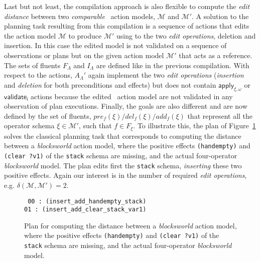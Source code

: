 Last but not least, the compilation approach is also flexible to compute the {\em edit distance} between two {\em comparable} \strips\ action models, $\mathcal{M}$ and $\mathcal{M}'$. A solution to the planning task resulting from this compilation is a sequence of actions that edits the action model $\mathcal{M}$ to produce $\mathcal{M}'$ using to the two {\em edit operations}, deletion and insertion. In this case the edited model is not validated on a sequence of observations or plans but on the given action model $\mathcal{M}'$ that acts as a reference. The sets of fluents $F_{\Lambda}$ and $I_{\Lambda}$ are defined like in the previous compilation. With respect to the actions, $A_{\Lambda}'$ again implement the two {\em edit operations} ({\em insertion} and {\em deletion} for both preconditions and effects) but does not contain $\mathsf{apply_{\xi,\omega}}$ or $\mathsf{validate_{i}}$ actions because the edited \strips\ action model are not validated in any observation of plan executions. Finally, the goals are also different and are now defined by the set of fluents, $pre_f(\xi)/del_f(\xi)/add_f(\xi)$ that represent all the operator schema $\xi\in\mathcal{M'}$, such that $f\in F_{\xi}$. To illustrate this, the plan of Figure~\ref{fig:plan-mdistance} solves the classical planning task that corresponds to computing the distance between a \emph{blocksworld} action model, where the positive effects {\tt\small (handempty)} and {\tt\small (clear ?v1)} of the {\tt\small stack} schema are missing, and the actual four-operator {\em blocksworld} model. The plan edits first the {\tt\small stack} schema, {\em inserting} these two positive effects. Again our interest is in the number of required {\em edit operations}, e.g. $\delta(\mathcal{M},\mathcal{M'})=2$.

\begin{figure}[hbt!]
{\tt\small
00 : (insert\_add\_handempty\_stack)\\
01 : (insert\_add\_clear\_stack\_var1)
}
 \caption{\small Plan for computing the distance between a \emph{blocksworld} action model, where the positive effects {\tt\small (handempty)} and {\tt\small (clear ?v1)} of the {\tt\small stack} schema are missing, and the actual four-operator {\em blocksworld} model.}
\label{fig:plan-mdistance}
\end{figure}









